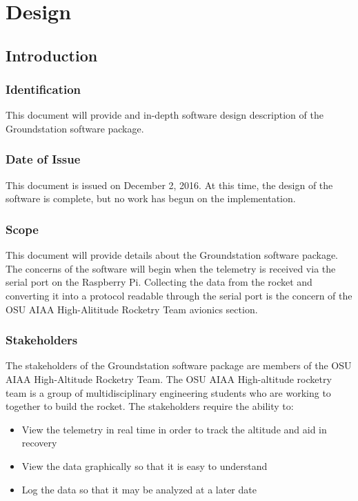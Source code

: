 \documentclass[10pt,draftclsnofoot,onecolumn]{IEEEtran}
\begin{document}
\newpage


	\section{Design}
	
	
	


	\subsection{Introduction}

	\subsubsection{Identification}
	This document will provide and in-depth software design description of the Groundstation software package.
	
	\subsubsection{Date of Issue}
	This document is issued on December 2, 2016.
	At this time, the design of the software is complete, but no work has begun on the implementation.
	
	\subsubsection{Scope}
	This document will provide details about the Groundstation software package.
	The concerns of the software will begin when the telemetry is received via the serial port on the Raspberry Pi.
	Collecting the data from the rocket and converting it into a protocol readable through the serial port is the
	concern of the \ac{OSU} \ac{AIAA} High-Alititude Rocketry Team avionics section.
		
	\subsubsection{Stakeholders}
	The stakeholders of the Groundstation software package are members of the \ac{OSU} \ac{AIAA} High-Altitude Rocketry Team.
	The \ac{OSU} \ac{AIAA} High-altitude rocketry team is a group of multidisciplinary engineering students who are working to together to build the rocket.
	The stakeholders require the ability to:
	\begin{itemize}
		\item View the telemetry in real time in order to track the altitude and aid in recovery
		\item View the data graphically so that it is easy to understand
		\item Log the data so that it may be analyzed at a later date
	\end{itemize}
\end{document}
